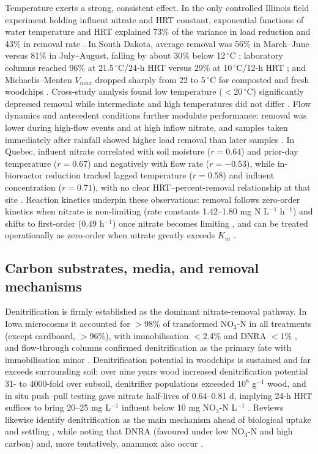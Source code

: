 \documentclass[11pt]{article}
\begin{document}
Temperature exerts a strong, consistent effect. In the only controlled Illinois field experiment holding influent nitrate and HRT constant, exponential functions of water temperature and HRT explained 73\% of the variance in load reduction and 43\% in removal rate \parencite{Bell2015}. In South Dakota, average removal was 56\% in March--June versus 81\% in July--August, falling by about 30\% below 12\,$^{\circ}$C \parencite{Thapa2023}; laboratory columns reached 96\% at 21.5\,$^{\circ}$C/24-h HRT versus 29\% at 10\,$^{\circ}$C/12-h HRT \parencite{Soupir2018}; and Michaelis--Menten $V_{max}$ dropped sharply from 22 to 5\,$^{\circ}$C for composted and fresh woodchips \parencite{Kouanda2021}. Cross-study analysis found low temperature ($<$20\,$^{\circ}$C) significantly depressed removal while intermediate and high temperatures did not differ \parencite{Zhang2021b}. Flow dynamics and antecedent conditions further modulate performance: removal was lower during high-flow events and at high inflow nitrate, and samples taken immediately after rainfall showed higher load removal than later samples \parencite{Thapa2023}. In Quebec, influent nitrate correlated with soil moisture ($r=0.64$) and prior-day temperature ($r=0.67$) and negatively with flow rate ($r=-0.53$), while in-bioreactor reduction tracked lagged temperature ($r=0.58$) and influent concentration ($r=0.71$), with no clear HRT--percent-removal relationship at that site \parencite{Husk2017}. Reaction kinetics underpin these observations: removal follows zero-order kinetics when nitrate is non-limiting (rate constants 1.42--1.80 mg N L$^{-1}$ h$^{-1}$) and shifts to first-order ($0.49$ h$^{-1}$) once nitrate becomes limiting \parencite{Hua2016}, and can be treated operationally as zero-order when nitrate greatly exceeds $K_m$ \parencite{Kouanda2021}.

\subsection{Carbon substrates, media, and removal mechanisms}

Denitrification is firmly established as the dominant nitrate-removal pathway. In Iowa microcosms it accounted for $>$98\% of transformed NO$_3$-N in all treatments (except cardboard, $>$96\%), with immobilisation $<$2.4\% and DNRA $<$1\% \parencite{Greenan2006}, and flow-through columns confirmed denitrification as the primary fate with immobilisation minor \parencite{Greenan2009}. Denitrification potential in woodchips is sustained and far exceeds surrounding soil: over nine years wood increased denitrification potential 31- to 4000-fold over subsoil, denitrifier populations exceeded $10^8$ g$^{-1}$ wood, and in situ push--pull testing gave nitrate half-lives of 0.64--0.81 d, implying 24-h HRT suffices to bring 20--25 mg L$^{-1}$ influent below 10 mg NO$_3$-N L$^{-1}$ \parencite{Moorman2010}. Reviews likewise identify denitrification as the main mechanism ahead of biological uptake and settling \parencite{Mendes2021}, while noting that DNRA (favoured under low NO$_3$-N and high carbon) and, more tentatively, anammox also occur \parencite{Hartfiel2022}.
\end{document}
